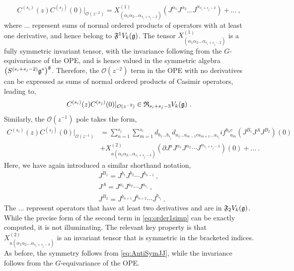 \begin{equation} \label{eq:order2simp}
    C^{(s_i)}(z) C^{(s_j)}(0)|_{\mathcal{O}(z^{-2})} = X^{(1)}_{(\alpha_1 \alpha_2 \ldots \alpha_{s_i+s_j-2})} (J^{\alpha_1} J^{\alpha_2} \ldots J^{\alpha_{s_i+s_j-2}}) + \ldots~,
\end{equation}
where $\ldots$ represent sums of normal ordered products of operators with at least one derivative, and hence belong to $\mathfrak{F}^1 V_k(\mathfrak{g})$. The tensor $X^{(1)}_{(\alpha_1 \alpha_2 \ldots \alpha_{s_i+s_j-2})}$ is a fully symmetric invariant tensor, with the invariance following from the $G$-equivariance of the OPE, and is hence valued in the symmetric algebra $\left(S^{(s_i+s_j-2)} \mathfrak{g}^*\right)^{\mathfrak{g}}$. Therefore, the $\mathcal{O}(z^{-2})$ term in the OPE with no derivatives can be expressed as sums of normal ordered products of Casimir operators, leading to,
\begin{equation}
    C^{(s_i)}(z) C^{(s_j)}(0)|_{\mathcal{O}(z^{-2})} \in \mathfrak{R}_{s_i+s_j-3} V_k(\mathfrak{g})~.
\end{equation}
Similarly, the $\mathcal{O}(z^{-1})$ pole takes the form,
\begin{equation} \label{eq:order1simp}
\begin{split}
    C^{(s_i)}(z) C^{(s_j)}(0)|_{\mathcal{O}(z^{-1})} &= \sum_{n=1}^{s_j} \sum_{m = 1}^{s_i} d_{b_1 \ldots b_{s_j}} d_{a_1 \ldots a_{m-1} c a_{m+1} \ldots a_{s_i}} if^{b_n c}_{\ \ \ \ a_m} (J^{B_{1}} J^{A} J^{B_{2}})(0) \\ &+ X^{(2)}_{a (\alpha_1 \alpha_2 \ldots \alpha_{s_i+s_j-3})} (\partial J^aJ^{\alpha_1} J^{\alpha_2} \cdots J^{\alpha_{s_i+s_j-3}})(0) + \ldots~.
\end{split}
\end{equation}
Here, we have again introduced a similar shorthand notation, 
\begin{equation}
\begin{split}
    &J^{B_{1}} = J^{b_1} J^{b_2} \cdots J^{b_{n-1}}~, \\
    &J^{A} = J^{a_1} J^{a_2} \cdots J^{a_{s_i}}~, \\
    &J^{B_{2}} = J^{b_{n+1}} J^{b_{n+2}} \cdots J^{b_{s_j}}~.
\end{split}
\end{equation}
The $\ldots$ represent operators that have at least two derivatives and are in $\mathfrak{F}_2 V_k(\mathfrak{g})$. While the precise form of the second term in \eqref{eq:order1simp} can be exactly computed, it is not illuminating. The relevant key property is that $X^{(2)}_{a (\alpha_1 \alpha_2 \ldots \alpha_{s_i+s_j-3})}$ is an invariant tensor that is symmetric in the bracketed indices. As before, the symmetry follows from \eqref{eq:AntiSymJJ}, while the invariance follows from the $G$-equivariance of the OPE. 

